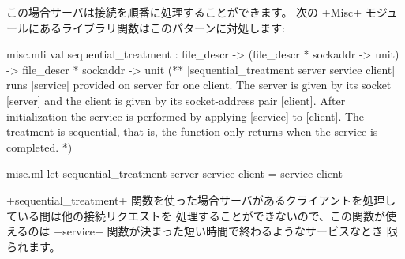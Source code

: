 この場合サーバは接続を順番に処理することができます。
次の \ml+Misc+ モジュールにあるライブラリ関数はこのパターンに対処します:
\begin{codefile}{misc.mli}
val sequential_treatment :
file_descr -> (file_descr * sockaddr -> unit) ->
file_descr * sockaddr -> unit
(** [sequential_treatment server service client] runs [service] provided
      on server for one client. The server is given by its socket [server]
      and the client is given by its socket-address pair [client]. After
      initialization the service is performed by applying [service] to
      [client]. The treatment is sequential, that is, the function only
      returns when the service is completed. *)
\end{codefile}
%
\begin{listingcodefile}{misc.ml}
let sequential_treatment server service client = service client
\end{listingcodefile}
\ml+sequential_treatment+ 関数を使った場合サーバがあるクライアントを処理している間は他の接続リクエストを
処理することができないので、この関数が使えるのは \ml+service+ 関数が決まった短い時間で終わるようなサービスなとき
限られます。

